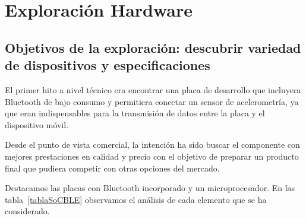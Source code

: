 
\cleardoublepage


\chapter{Exploración Hardware}
\label{makereference3}

\section{Objetivos de la exploración: descubrir variedad de dispositivos y especificaciones}
\label{makereference3.1}

El primer hito a nivel técnico era encontrar una placa de desarrollo que incluyera Bluetooth de bajo consumo y permitiera conectar un sensor de acelerometría, ya que eran indispensables para la transmisión de datos entre la placa y el dispositivo móvil. 

Desde el punto de vista comercial, la intención ha sido buscar el componente con mejores prestaciones en calidad y precio con el objetivo de preparar un producto final que pudiera competir con otras opciones del mercado.

Destacamos las placas con Bluetooth incorporado y un microprocesador. En las tabla~\ref{tablaSoCBLE} observamos el análisis de cada elemento que se ha considerado.

